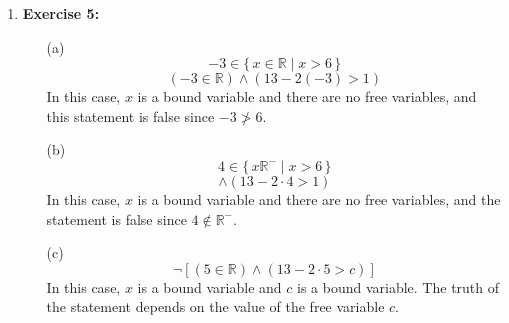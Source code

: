 \documentclass{article} %
\newcommand\Set[2]{\{\,#1\mid#2\,\}}
\begin{document}
\begin{enumerate}
        \item \textbf{Exercise 5:}
        \begin{itemize}
            \item[(a)] 
            \begin{equation*}
                -3 \in \Set{x \in \mathbb{R}}{x > 6}    
            \end{equation*} 
            \begin{equation*}
                (-3 \in \mathbb{R}) \land (13 - 2(-3) > 1)
            \end{equation*}
            In this case, $x$ is a bound variable and there are no free variables, and this statement is false since $-3 \ngtr 6$.
            \item[(b)]
            \begin{equation*}
                4 \in \Set{x \mathbb{R}^{-}}{x > 6}
            \end{equation*}
            \begin{equation*}
                [(4 \in \mathbb{R}) \land (4 < 0)] \land (13 - 2 \cdot 4 > 1)
            \end{equation*}
            In this case, $x$ is a bound variable and there are no free variables, and the statement is false since $4 \notin \mathbb{R}^{-}$.
            \item[(c)]
            \begin{equation*}
                \neg [(5 \in \mathbb{R}) \land (13 - 2 \cdot 5 > c)]
            \end{equation*}
            In this case, $x$ is a bound variable and $c$ is a bound variable. The truth of the statement depends on the value of the free variable $c$.
        \end{itemize}

    \end{enumerate}
\end{document}
